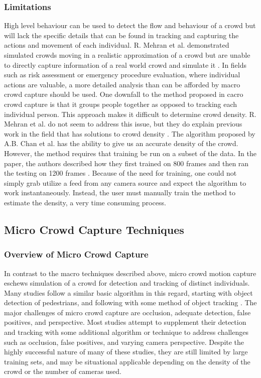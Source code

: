\documentclass[12pt, onecolumn, conference]{IEEEtran}
\begin{document}
\subsubsection{Limitations}

High level behaviour can be used to detect the flow and behaviour of a crowd but will lack the specific details that can be found in tracking and capturing the actions and movement of each individual. R. Mehran et al. demonstrated simulated crowds moving in a realistic approximation of a crowd but are unable to directly capture information of a real world crowd and simulate it \cite{R. Mehran}. 
In fields such as risk assessment or emergency procedure evaluation, where individual actions are valuable, a more detailed analysis than can be afforded by macro crowd capture should be used.
One downfall to the method proposed in cacro crowd capture is that it groups people together as opposed to tracking each individual person. This approach makes it difficult to determine crowd density. R. Mehran et al. do not seem to address this issue, but they do explain previous work in the field that has solutions to crowd density \cite{N. Courty}\cite{R. Mehran}\cite{S. Saxena}. 
The algorithm proposed by A.B. Chan et al. has the ability to give us an accurate density of the crowd. However, the method requires that training be run on a subset of the data. In the paper, the authors described how they first trained on 800 frames and then ran the testing on 1200 frames \cite{A.B. Chan}. Because of the need for training, one could not simply grab utilize a feed from any camera source and expect the algorithm to work instantaneously. Instead, the user must manually train the method to estimate the density, a very time consuming process.

\subsection{Micro Crowd Capture Techniques}

\subsubsection{Overview of Micro Crowd Capture}

In contrast to the macro techniques described above, micro crowd motion capture eschews simulation of a crowd for detection and tracking of distinct individuals. Many studies follow a similar basic algorithm in this regard, starting with object detection of pedestrians, and following with some method of object tracking \cite{M. Rodriguez}\cite{D. Zhang}\cite{I. Ali}\cite{F. Zhao}\cite{I. Ali2}. The major challenges of micro crowd capture are occlusion, adequate detection, false positives, and perspective. Most studies attempt to supplement their detection and tracking with some additional algorithm or technique to address challenges such as occlusion, false positives, and varying camera perspective. 
Despite the highly successful nature of many of these studies, they are still limited by large training sets, and may be situational applicable depending on the density of the crowd or the number of cameras used.
\end{document}
